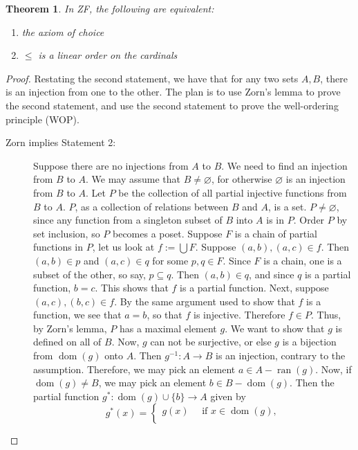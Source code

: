 \documentclass[12pt]{article}
\newtheorem{thm}{Theorem}
\begin{document}
\begin{thm} In ZF, the following are equivalent:
\begin{enumerate}
\item the axiom of choice
\item $\le$ is a linear order on the cardinals
\end{enumerate}
\end{thm}
\begin{proof}  Restating the second statement, we have that for any two sets $A,B$, there is an injection from one to the other.  The plan is to use Zorn's lemma to prove the second statement, and use the second statement to prove the well-ordering principle (WOP).
\begin{description}
\item[Zorn implies Statement 2:] Suppose there are no injections from $A$ to $B$.  We need to find an injection from $B$ to $A$.  We may assume that $B\ne \varnothing$, for otherwise $\varnothing$ is an injection from $B$ to $A$.  Let $P$ be the collection of all partial injective functions from $B$ to $A$.  $P$, as a collection of relations between $B$ and $A$, is a set.  $P\ne \varnothing$, since any function from a singleton subset of $B$ into $A$ is in $P$.  Order $P$ by set inclusion, so $P$ becomes a poset.  Suppose $F$ is a chain of partial functions in $P$, let us look at $f:=\bigcup F$.  Suppose $(a,b),(a,c)\in f$.  Then $(a,b)\in p$ and $(a,c)\in q$ for some $p,q\in F$.  Since $F$ is a chain, one is a subset of the other, so say, $p\subseteq q$.  Then $(a,b)\in q$, and since $q$ is a partial function, $b=c$.  This shows that $f$ is a partial function.  Next, suppose $(a,c),(b,c)\in f$.  By the same argument used to show that $f$ is a function, we see that $a=b$, so that $f$ is injective.  Therefore $f\in P$.  Thus, by Zorn's lemma, $P$ has a maximal element $g$.  We want to show that $g$ is defined on all of $B$.  Now, $g$ can not be surjective, or else $g$ is a bijection from $\operatorname{dom}(g)$ onto $A$.  Then $g^{-1}: A\to B$ is an injection, contrary to the assumption.  Therefore, we may pick an element $a\in A-\operatorname{ran}(g)$.  Now, if $\operatorname{dom}(g)\ne B$, we may pick an element $b\in B-\operatorname{dom}(g)$.  Then the partial function $g^*: \operatorname{dom}(g)\cup \lbrace b\rbrace \to A$ given by 
\begin{displaymath}
g^*(x)= \left\{
\begin{array}{ll}
g(x) \quad \mbox{ if }x\in \operatorname{dom}(g),\\

\end{array}
\end{displaymath}
\end{description}
\end{proof}
\end{document}
